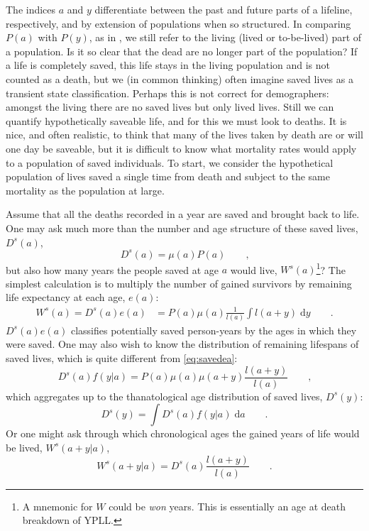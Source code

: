 \documentclass{article}
\newcommand{\dd}{\; \mathrm{d}}
\newcommand{\tc}{\quad\quad\text{,}}
\newcommand{\tp}{\quad\quad\text{.}}
\begin{document}
The indices $a$ and $y$ differentiate between the past and future
parts of a lifeline, respectively, and by extension of populations when
so structured.
In comparing $P(a)$ with $P(y)$, as in \citet{brouard1986structure}, we still
refer to the living (lived or to-be-lived) part of a population.
Is it so clear that the dead are no longer part of the population? If a life is
completely saved, this life stays in the living population and is not counted
as a death, but we (in common thinking) often imagine saved lives as a transient
state classification.
Perhaps this is not correct for demographers: amongst the living there
are no saved lives but only lived lives. Still we can quantify
hypothetically saveable life, and for this we must look to deaths.
It is nice, and often realistic, to think that many of the lives taken by death
are or will one day be saveable, but it is difficult to know what mortality
rates would apply to a population of saved individuals. To start, we consider
the hypothetical population of lives saved a single time from death and subject to
the same mortality as the population at large.

Assume that all the deaths recorded in a year are saved and brought back to
life. One may ask much more than the number and age structure of these saved
lives, $D^s(a)$,
\begin{equation}
\label{eq:Dsa}
D^s(a) = \mu(a)P(a) \tc
\end{equation}
but also how many years the people saved at age $a$ would live, 
$W^s(a)$\footnote{A mnemonic for $W$ could be \textit{won} years. This is
essentially an age at death breakdown of YPLL.}? The simplest calculation is
to multiply the number of gained survivors by remaining life expectancy at each
age, $e(a)$:
\begin{align}
\label{eq:savedea}
W^s(a) = D^s(a)e(a) &= P(a)\mu(a)\frac{1}{l(a)}\int l(a+y) \dd y \tp
\end{align}
$D^s(a)e(a)$ classifies potentially saved person-years by the
ages in which they were saved. One may also wish to know the distribution of remaining lifespans of saved
lives, which is quite different from \eqref{eq:savedea}:
\begin{equation}
\label{eq:savedya}
D^s(a)f(y|a) = P(a)\mu(a)\mu(a+y) \frac{l(a+y)}{l(a)} \tc
\end{equation}
which aggregates up to the thanatological age distribution of saved lives,
$D^s(y)$:
\begin{equation}
\label{eq:savedy}
D^s(y) = \int D^s(a)f(y|a) \dd a \tp
\end{equation}
Or one might ask through which chronological ages the gained years of life
would be lived, $W^s(a+y|a)$,
\begin{equation}
\label{eq:gaineday}
W^s(a+y|a) = D^s(a)\frac{l(a+y)}{l(a)} \tp
\end{equation}
\end{document}
